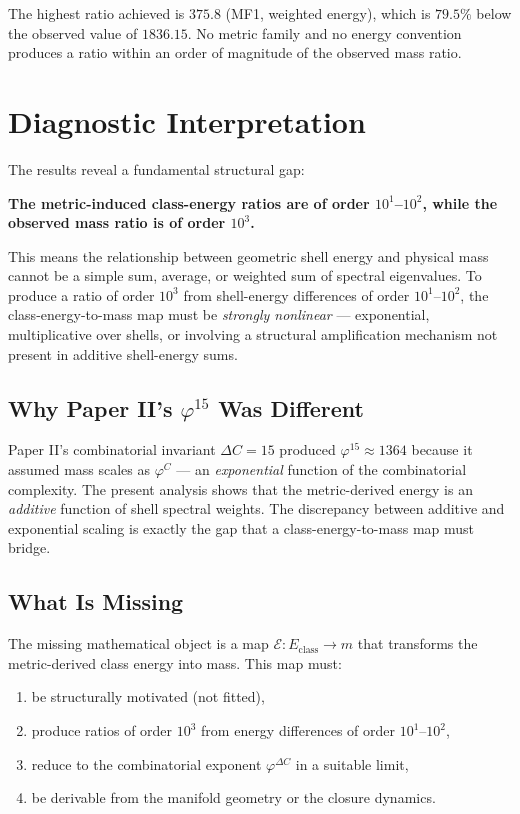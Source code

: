 \documentclass[12pt]{article}
\newcommand{\phig}{\varphi}
\begin{document}
The highest ratio achieved is $375.8$ (MF1, weighted energy), which is $79.5\%$ below the observed value of $1836.15$. No metric family and no energy convention produces a ratio within an order of magnitude of the observed mass ratio.

\section{Diagnostic Interpretation}\label{sec:diagnostic}

The results reveal a fundamental structural gap:

\textbf{The metric-induced class-energy ratios are of order $10^1$--$10^2$, while the observed mass ratio is of order $10^3$.}

This means the relationship between geometric shell energy and physical mass cannot be a simple sum, average, or weighted sum of spectral eigenvalues. To produce a ratio of order $10^3$ from shell-energy differences of order $10^1$--$10^2$, the class-energy-to-mass map must be \textit{strongly nonlinear} --- exponential, multiplicative over shells, or involving a structural amplification mechanism not present in additive shell-energy sums.

\subsection{Why Paper II's $\phig^{15}$ Was Different}

Paper II's combinatorial invariant $\Delta C = 15$ produced $\phig^{15} \approx 1364$ because it assumed mass scales as $\phig^C$ --- an \textit{exponential} function of the combinatorial complexity. The present analysis shows that the metric-derived energy is an \textit{additive} function of shell spectral weights. The discrepancy between additive and exponential scaling is exactly the gap that a class-energy-to-mass map must bridge.

\subsection{What Is Missing}

The missing mathematical object is a map $\mathcal{E}: E_{\mathrm{class}} \to m$ that transforms the metric-derived class energy into mass. This map must:
\begin{enumerate}
    \item be structurally motivated (not fitted),
    \item produce ratios of order $10^3$ from energy differences of order $10^1$--$10^2$,
    \item reduce to the combinatorial exponent $\phig^{\Delta C}$ in a suitable limit,
    \item be derivable from the manifold geometry or the closure dynamics.
\end{enumerate}
\end{document}
